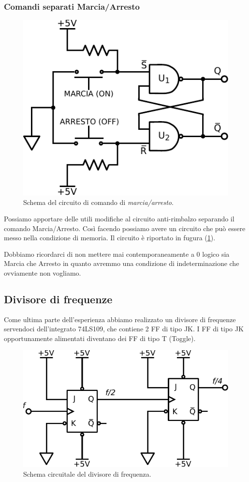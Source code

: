 \subsubsection*{Comandi separati Marcia/Arresto}

\begin{figure}[H]
	\centering
	\includegraphics[width=.25\textwidth]{../E11/latex/motorefermo.pdf}
	\caption{Schema del circuito di comando di \textit{marcia/arresto}.}
	\label{cir11:marcia}
\end{figure}

Possiamo apportare delle utili modifiche al circuito anti-rimbalzo separando il comando Marcia/Arresto.
Così facendo possiamo avere un circuito che può essere messo nella condizione di memoria.
Il circuito è riportato in fugura (\ref{cir11:marcia}).

Dobbiamo ricordarci di non mettere mai contemporaneamente a 0 logico sia Marcia che Arresto in quanto avremmo una condizione di indeterminazione che ovviamente non vogliamo.

\subsection{Divisore di frequenze}



Come ultima parte dell'esperienza abbiamo realizzato un divisore di frequenze servendoci dell'integrato 74LS109, che contiene 2 FF di tipo JK.
I FF di tipo JK opportunamente alimentati diventano dei FF di tipo T (Toggle).

\begin{figure}
	\centering
	\includegraphics[width=.30\textwidth]{../E11/latex/frequency-divider.pdf}
	\caption{Schema circuitale del divisore di frequenza.}
	\label{cir11:freq-div}
\end{figure}

